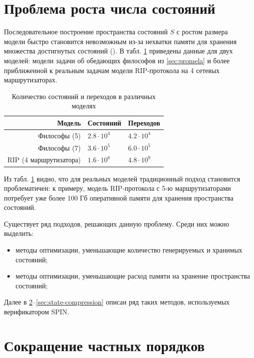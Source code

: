\section{Проблема роста числа состояний}
\label{sec:state-explosion}

Последовательное построение пространства состояний $S$ с ростом размера модели
быстро становится невозможным из-за нехватки памяти для хранения множества
достигнутых состояний (). В табл. \ref{tab:models-statecount}
приведены данные для двух моделей: модели задачи об обедающих философов из
\ref{sec:promela} и более приближенной к реальным задачам модели RIP-протокола
на 4 сетевых маршрутизаторах.~\cite{RipOnSpin}

\begin{table}
  \centering
  \begin{tabular}{|r|l|l|}
    \hline
    Модель                  & Состояний         & Переходов       \\
    \hline
    Философы (5)            & $2.8 \cdot 10^4$  & $4.2 \cdot 10^4$ \\
    Философы (7)            & $3.6 \cdot 10^5$  & $6.0 \cdot 10^5$ \\
    RIP (4 маршрутизатора)  & $1.6 \cdot 10^8$  & $4.8 \cdot 10^9$ \\
    \hline
  \end{tabular}
  \caption{Количество состояний и переходов в различных моделях}
\label{tab:models-statecount}
\end{table}

Из табл. \ref{tab:models-statecount} видно, что для реальных моделей традиционный подход
становится проблематичен: к примеру, модель RIP-протокола с 5-ю маршрутизаторами потребует
уже более 100 Гб оперативной памяти для хранения пространства состояний.

Существует ряд подходов, решающих данную проблему. Среди них можно выделить:

\begin{itemize}
\item методы оптимизации, уменьшающие количество генерируемых и хранимых состояний;
\item методы оптимизации, уменьшающие расход памяти на хранение пространства состояний;
\end{itemize}

Далее в \ref{sec:partial-order-reduction}--\ref{sec:state-compression} описан ряд таких методов,
используемых верификатором SPIN.

\section{Сокращение частных порядков}
\label{sec:partial-order-reduction}

